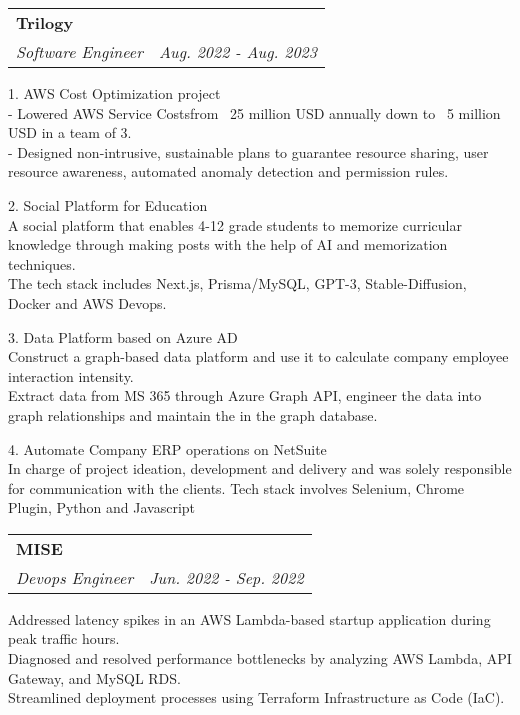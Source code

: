 \documentclass[letterpaper,11pt]{article}
\makeatletter
\renewenvironment{itemize}{
  \begin{list}{}{
    \setlength{\leftmargin}{0.6em}
    \setlength{\textwidth}{7.5in}
    \setlength{\topmargin}{-0.6in}
    \setlength{\textheight}{19.5in}
  }
}{
  \end{list}
}
\newcommand{\resitem}[1]{\item #1 \vspace{-2pt}}
\newcommand{\ressubheading}[4]{
\begin{tabular*}{6.5in}{l@{\extracolsep{\fill}}r}
		\textbf{#1} & #2 \\
		\textit{#3} & \textit{#4} \\
\end{tabular*}\vspace{-8.5pt}} %
\makeatother
\begin{document}
\begin{itemize}
	\ressubheading{Trilogy}{}{Software Engineer}{Aug. 2022 - Aug. 2023}
	\begin{itemize}
		\resitem{
1. AWS Cost Optimization project\\
- Lowered AWS Service Costsfrom ~25 million USD annually down to ~5 million USD in a team of 3. \\
- Designed non-intrusive, sustainable plans to guarantee resource sharing, user resource awareness, automated anomaly detection and permission rules. \\
		}
		\resitem{
2. Social Platform for Education\\
A social platform that enables 4-12 grade students to memorize curricular knowledge through making posts with the help of AI and memorization techniques.\\
The tech stack includes Next.js, Prisma/MySQL, GPT-3, Stable-Diffusion, Docker and AWS Devops.\\
		}
		\resitem{
3. Data Platform based on Azure AD\\
Construct a graph-based data platform and use it to calculate company employee interaction intensity.\\
Extract data from MS 365 through Azure Graph API, engineer the data into graph relationships and maintain the in the graph database.\\
		}
		\resitem{
4. Automate Company ERP operations on NetSuite\\
In charge of project ideation, development and delivery and was solely responsible for communication with the clients. Tech stack involves Selenium, Chrome Plugin, Python and Javascript\\
		}
	\end{itemize}
	\ressubheading{MISE}{}{Devops Engineer}{Jun. 2022 - Sep. 2022}
	\begin{itemize}
		\resitem{
Addressed latency spikes in an AWS Lambda-based startup application during peak traffic hours.\\
Diagnosed and resolved performance bottlenecks by analyzing AWS Lambda, API Gateway, and MySQL RDS.\\
Streamlined deployment processes using Terraform Infrastructure as Code (IaC).\\
			}
	\end{itemize}
\end{itemize}
\end{document}
